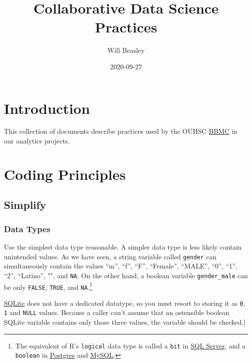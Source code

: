 \documentclass[
]{book}
\title{Collaborative Data Science Practices}
\author{Will Beasley}
\date{2020-09-27}
\begin{document}
\maketitle

{
\setcounter{tocdepth}{1}
\tableofcontents
}
\hypertarget{intro}{%
\chapter{Introduction}\label{intro}}

This collection of documents describe practices used by the OUHSC \href{https://ouhsc.edu/bbmc}{BBMC} in our analytics projects.

\hypertarget{coding}{%
\chapter{Coding Principles}\label{coding}}

\hypertarget{coding-simplify}{%
\section{Simplify}\label{coding-simplify}}

\hypertarget{coding-simplify-types}{%
\subsection{Data Types}\label{coding-simplify-types}}

Use the simplest data type reasonable. A simpler data type is less likely contain unintended values. As we have seen, a string variable called \texttt{gender} can simultaneously contain the values ``m'', ``f'', ``F'', ``Female'', ``MALE'', ``0'', ``1'', ``2'', ``Latino'', "", and \texttt{NA}. On the other hand, a boolean variable \texttt{gender\_male} can be only \texttt{FALSE}, \texttt{TRUE}, and \texttt{NA}.\footnote{The equivalent of R's \texttt{logical} data type is called a \texttt{bit} in \href{https://docs.microsoft.com/en-us/sql/t-sql/data-types/bit-transact-sql}{SQL Server}, and a \texttt{boolean} in \href{https://www.postgresql.org/docs/current/datatype-boolean.html}{Postgres} and \href{https://dev.mysql.com/doc/refman/8.0/en/boolean-literals.html}{MySQL}.}

\href{https://www.sqlite.org/datatype3.html}{SQLite} does not have a dedicated datatype, so you must resort to storing it as \texttt{0}, \texttt{1} and \texttt{NULL} values. Because a caller can't assume that an ostensible boolean SQLite variable contains only those three values, the variable should be checked.{]}
\end{document}
